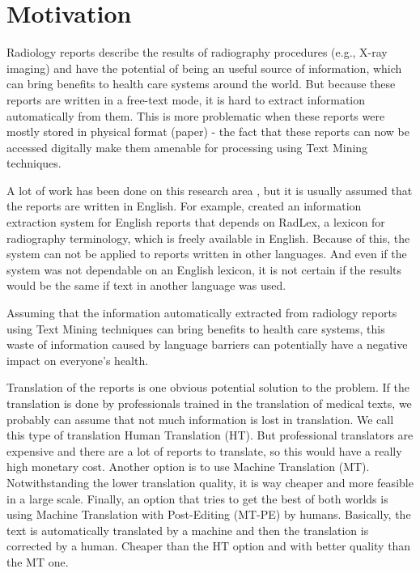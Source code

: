 \label{chap1}

\section{Motivation}
\label{motivation}

Radiology reports describe the results of radiography procedures (e.g., X-ray imaging) and have the potential of being an useful source of information, which can bring benefits to health care systems around the world. But because these reports are written in a free-text mode, it is hard to extract information automatically from them. This is more problematic when these reports were mostly stored in physical format (paper) - the fact that these reports can now be accessed digitally make them amenable for processing using Text Mining techniques. 

A lot of work has been done on this research area \citep{Pons2016}, but it is usually assumed that the reports are written in English. For example, \citep{Hassanpour2016} created an information extraction system for English reports that depends on RadLex, a lexicon for radiography terminology, which is freely available in English. Because of this, the system can not be applied to reports written in other languages. And even if the system was not dependable on an English lexicon, it is not certain if the results would be the same if text in another language was used.

Assuming that the information automatically extracted from radiology reports using Text Mining techniques can bring benefits to health care systems, this waste of information caused by language barriers can potentially have a negative impact on everyone's health.

Translation of the reports is one obvious potential solution to the problem. If the translation is done by professionals trained in the translation of medical texts, we probably can assume that not much information is lost in translation. We call this type of translation Human Translation (HT). But professional translators are expensive and there are a lot of reports to translate, so this would have a really high monetary cost. Another option is to use Machine Translation (MT). Notwithstanding the lower translation quality, it is way cheaper and more feasible in a large scale. Finally, an option that tries to get the best of both worlds is using Machine Translation with Post-Editing (MT-PE) by humans. Basically, the text is automatically translated by a machine and then the translation is corrected by a human. Cheaper than the HT option and with better quality than the MT one. 

